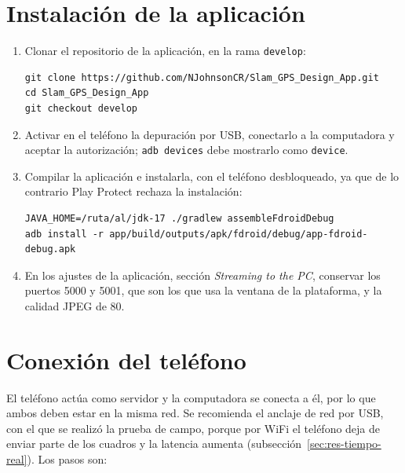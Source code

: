 \section{Instalación de la aplicación}

\begin{enumerate}
\item Clonar el repositorio de la aplicación, en la rama \texttt{develop}:
\begin{small}
\begin{verbatim}
git clone https://github.com/NJohnsonCR/Slam_GPS_Design_App.git
cd Slam_GPS_Design_App
git checkout develop
\end{verbatim}
\end{small}

\item Activar en el teléfono la depuración por USB, conectarlo a la computadora y aceptar la autorización; \texttt{adb devices} debe mostrarlo como \texttt{device}.

\item Compilar la aplicación e instalarla, con el teléfono desbloqueado, ya que de lo contrario Play Protect rechaza la instalación:
\begin{small}
\begin{verbatim}
JAVA_HOME=/ruta/al/jdk-17 ./gradlew assembleFdroidDebug
adb install -r app/build/outputs/apk/fdroid/debug/app-fdroid-debug.apk
\end{verbatim}
\end{small}

\item En los ajustes de la aplicación, sección \textit{Streaming to the PC}, conservar los puertos 5000 y 5001, que son los que usa la ventana de la plataforma, y la calidad JPEG de 80.
\end{enumerate}

\section{Conexión del teléfono}

El teléfono actúa como servidor y la computadora se conecta a él, por lo que ambos deben estar en la misma red.
Se recomienda el anclaje de red por USB, con el que se realizó la prueba de campo, porque por WiFi el teléfono deja de enviar parte de los cuadros y la latencia aumenta (subsección~\ref{sec:res-tiempo-real}).
Los pasos son:

